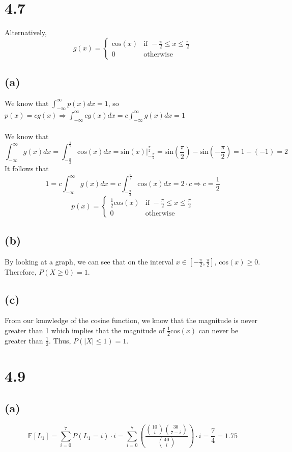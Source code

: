 \documentclass[11pt]{article}
\begin{document}
\section*{4.7}
Alternatively, 
\[g(x)=\begin{cases}
	\text{cos}(x) & \text{if }-\frac{\pi}{2}\leq x\leq\frac{\pi}{2} \\
	0 & \text{otherwise}
\end{cases}\]
\subsection*{(a)}
We know that $\int_{-\infty}^{\infty}p(x)dx=1$, so $p(x)=cg(x)\Rightarrow\int_{-\infty}^{\infty}cg(x)dx=c\int_{-\infty}^{\infty}g(x)dx=1$ \\ \\
We know that
\[\int_{-\infty}^{\infty}g(x)dx=\int_{-\frac{\pi}{2}}^{\frac{\pi}{2}}\text{cos}(x)dx=\text{sin}(x)|_{-\frac{\pi}{2}}^{\frac{\pi}{2}}=\text{sin}(\frac{\pi}{2})-\text{sin}(-\frac{\pi}{2})=1-(-1)=2\]
It follows that
\[1=c\int_{-\infty}^{\infty}g(x)dx=c\int_{-\frac{\pi}{2}}^{\frac{\pi}{2}}\text{cos}(x)dx=2\cdot c\Rightarrow c=\frac{1}{2}\]
\[p(x)=\begin{cases}
	\frac{1}{2}\text{cos}(x) & \text{if }-\frac{\pi}{2}\leq x \leq\frac{\pi}{2} \\
	0 & \text{otherwise}
\end{cases}\]
\subsection*{(b)}
By looking at a graph, we can see that on the interval $x\in[-\frac{\pi}{2},\frac{\pi}{2}]$, cos$(x)\geq0$. Therefore, $P(X\geq0)=1$.
\subsection*{(c)}
From our knowledge of the cosine function, we know that the magnitude is never greater than 1 which implies that the magnitude of $\frac{1}{2}$cos$(x)$ can never be greater than $\frac{1}{2}$. Thus, $P(|X|\leq1)=1$.

\section*{4.9}
\subsection*{(a)}
\[\mathbb{E}[L_1]=\sum_{i=0}^7P(L_1=i)\cdot i=\sum_{i=0}^7\left(\frac{\binom{10}{i}\binom{30}{7-i}}{\binom{40}{i}}\right)\cdot i=\frac{7}{4}=1.75\]
\end{document}

